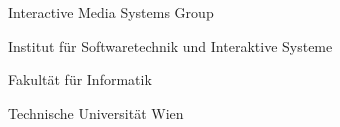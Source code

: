 \begin{center}
\vspace{0pt}\raggedright\thesistitlefontnormalsize\sffamily
\begin{minipage}[t][1.6cm][t]{\textwidth}%
  \centering

  Interactive Media Systems Group

  Institut f\"ur Softwaretechnik und Interaktive Systeme

  Fakult\"{a}t f\"{u}r Informatik 

  Technische Universit\"{a}t Wien

\end{minipage}




\end{center}

\pagestyle{empty}
\cleardoublepage


\setlength{\baselineskip}{\tmpbaselineskip}
\setlength{\parindent}{\tmpparindent}

\restoregeometry


